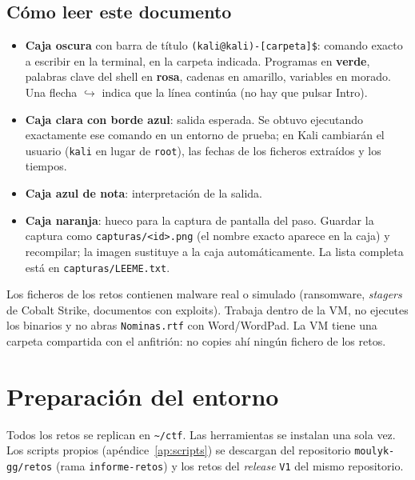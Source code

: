 \documentclass[11pt,a4paper]{article}
\begin{document}
\subsection{Cómo leer este documento}
\begin{itemize}
  \item \textbf{Caja oscura} con barra de título \texttt{(kali@kali)-[carpeta]\$}: comando exacto a escribir en la
        terminal, en la carpeta indicada. Programas en \textcolor{cmdc!70!black}{\textbf{verde}}, palabras clave del
        shell en \textcolor{kwc!80!black}{\textbf{rosa}}, cadenas en \textcolor{strc!50!black}{amarillo}, variables en
        \textcolor{varc!80!black}{morado}. Una flecha $\hookrightarrow$ indica que la línea continúa (no hay que pulsar Intro).
  \item \textbf{Caja clara con borde azul}: salida esperada. Se obtuvo ejecutando exactamente ese comando en un entorno de
        prueba; en Kali cambiarán el usuario (\texttt{kali} en lugar de \texttt{root}), las fechas de los ficheros
        extraídos y los tiempos.
  \item \textbf{Caja azul de nota}: interpretación de la salida.
  \item \textbf{Caja naranja}: hueco para la captura de pantalla del paso. Guardar la captura como
        \texttt{capturas/<id>.png} (el nombre exacto aparece en la caja) y recompilar; la imagen sustituye a la caja
        automáticamente. La lista completa está en \texttt{capturas/LEEME.txt}.
\end{itemize}

\begin{aviso}[Seguridad]
Los ficheros de los retos contienen malware real o simulado (ransomware, \emph{stagers} de Cobalt Strike, documentos
con exploits). Trabaja dentro de la VM, no ejecutes los binarios y no abras \texttt{Nominas.rtf} con Word/WordPad.
La VM tiene una carpeta compartida con el anfitrión: no copies ahí ningún fichero de los retos.
\end{aviso}


\section{Preparación del entorno}
Todos los retos se replican en \texttt{\textasciitilde/ctf}. Las herramientas se instalan una sola vez. Los scripts
propios (apéndice~\ref{ap:scripts}) se descargan del repositorio \texttt{moulyk-gg/retos} (rama \texttt{informe-retos}) y
los retos del \emph{release} \texttt{V1} del mismo repositorio.
\end{document}
